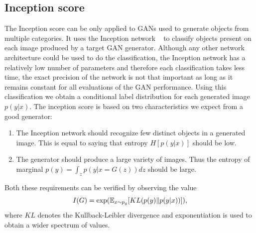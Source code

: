 \subsection{Inception score}
The Inception score can be only applied to GANs used to generate objects from multiple categories. It uses the Inception network ~\cite{inception} to classify objects present on each image produced by a target GAN generator. Although any other network architecture could be used to do the classification, the Inception network has a relatively low number of parameters and therefore each classification takes less time, the exact precision of the network is not that important as long as it remains constant for all evaluations of the GAN performance. Using this classification we obtain a conditional label distribution for each generated image $p(y | x)$. The inception score is based on two characteristics we expect from a good generator:
\begin{enumerate}
	\item The Inception network should recognize few distinct objects in a generated image. This is equal to saying that entropy $H[p(y|x)]$ should be low.
	\item The generator should produce a large variety of images. Thus the entropy of marginal $p(y) = \int_z p(y|x=G(z))dz$ should be large. 
\end{enumerate}
Both these requirements can be verified by observing the value 
\begin{equation}
I(G) = \exp(\operatorname{\mathbb{E}}_{x \sim p_g}[KL(p(y) \lVert p(y|x))]),
\end{equation}
where $KL$ denotes the Kullback-Leibler divergence and exponentiation is used to obtain a wider spectrum of values. 


